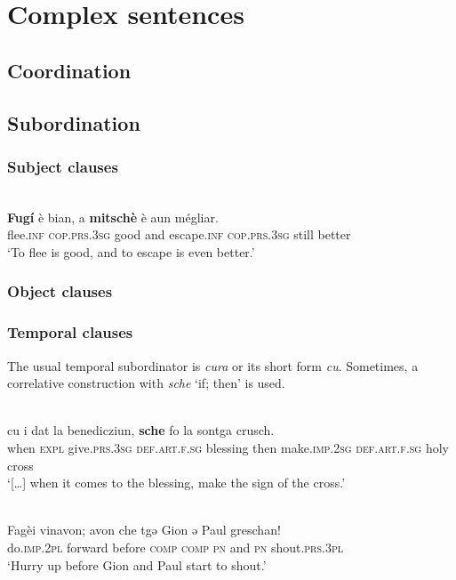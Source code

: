 \chapter{Complex sentences}

\section{Coordination}

\section{Subordination}

\subsection{Subject clauses}

\ea\label{}
\\
\gll \textbf{Fugí} è bian, a \textbf{mitschè} è aun mégliar. \\
   flee.\textsc{inf} \textsc{cop.prs.3sg} good and escape.\textsc{inf} \textsc{cop.prs.3sg} still better  \\
\glt `To flee is good, and to escape is even better.'
\z


\subsection{Object clauses}

\subsection{Temporal clauses}

The usual temporal subordinator is \textit{cura} or its short form \textit{cu}. Sometimes, a correlative construction with \textit{sche} `if; then' is used.

\ea\label{ex:1:}
\\
\gll  […] cu i dat la benedicziun, \textbf{sche} fo la sontga crusch.\\
    […] when \textsc{expl} give.\textsc{prs.3sg} \textsc{def.art.f.sg} blessing then make.\textsc{imp.2sg} \textsc{def.art.f.sg} holy cross\\
\glt `[…] when it comes to the blessing, make the sign of the cross.'
\z



\ea\label{ex:1:}
 {\citealt[30]{Büchli1966}}\\
\gll    Fagèi vinavon; avon che tgǝ Gion ǝ Paul greschan!\\
     do.\textsc{imp.2pl} forward before \textsc{comp} \textsc{comp} \textsc{pn} and \textsc{pn} shout.\textsc{prs.3pl}\\
\glt `Hurry up before Gion and Paul start to shout.'
\z



